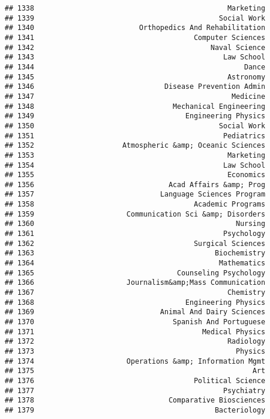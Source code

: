 \documentclass[
]{article}
\begin{document}
\begin{verbatim}
## 1338                                              Marketing
## 1339                                            Social Work
## 1340                         Orthopedics And Rehabilitation
## 1341                                      Computer Sciences
## 1342                                          Naval Science
## 1343                                             Law School
## 1344                                                  Dance
## 1345                                              Astronomy
## 1346                               Disease Prevention Admin
## 1347                                               Medicine
## 1348                                 Mechanical Engineering
## 1349                                    Engineering Physics
## 1350                                            Social Work
## 1351                                             Pediatrics
## 1352                     Atmospheric &amp; Oceanic Sciences
## 1353                                              Marketing
## 1354                                             Law School
## 1355                                              Economics
## 1356                                Acad Affairs &amp; Prog
## 1357                              Language Sciences Program
## 1358                                      Academic Programs
## 1359                      Communication Sci &amp; Disorders
## 1360                                                Nursing
## 1361                                             Psychology
## 1362                                      Surgical Sciences
## 1363                                           Biochemistry
## 1364                                            Mathematics
## 1365                                  Counseling Psychology
## 1366                      Journalism&amp;Mass Communication
## 1367                                              Chemistry
## 1368                                    Engineering Physics
## 1369                              Animal And Dairy Sciences
## 1370                                 Spanish And Portuguese
## 1371                                        Medical Physics
## 1372                                              Radiology
## 1373                                                Physics
## 1374                      Operations &amp; Information Mgmt
## 1375                                                    Art
## 1376                                      Political Science
## 1377                                             Psychiatry
## 1378                                Comparative Biosciences
## 1379                                           Bacteriology

\end{verbatim}
\end{document}
